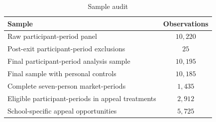 \begin{table}[htbp]
\centering
\caption{Sample audit}
\label{tab:sample_audit_rep}
\begin{tabular}{lc}
\toprule
Sample & Observations \\
\midrule
Raw participant-period panel & \(10{,}220\) \\
Post-exit participant-period exclusions & \(25\) \\
Final participant-period analysis sample & \(10{,}195\) \\
Final sample with personal controls & \(10{,}185\) \\
Complete seven-person market-periods & \(1{,}435\) \\
Eligible participant-periods in appeal treatments & \(2{,}912\) \\
School-specific appeal opportunities & \(5{,}725\) \\
\bottomrule
\end{tabular}
\end{table}
